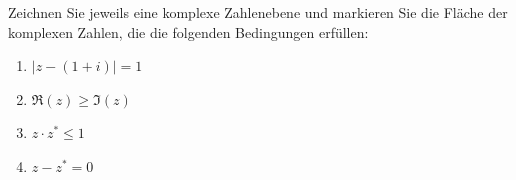 \begin{ExerciseBlock}
Zeichnen Sie jeweils eine komplexe Zahlenebene und markieren Sie die Fläche der komplexen Zahlen, die die folgenden Bedingungen erfüllen:
\begin{enumerate}[label=\alph*)]
	\item $|z - \left(1+i\right)| = 1$
	\item $\Re(z) \geq \Im(z)$
	\item $z \cdot z^* \leq  1$
	\item $z - z^* = 0$
\end{enumerate}

\end{ExerciseBlock}
